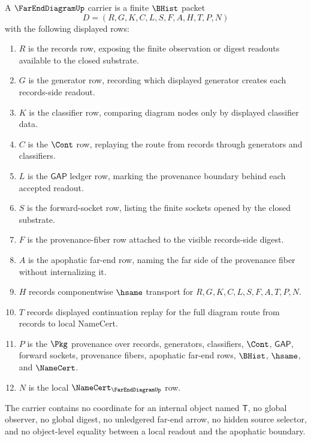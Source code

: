 \begin{definition}
\label{def:far-end-diagram-packet}
A $\FarEndDiagramUp$ carrier is a finite $\BHist$ packet
$$
D=(R,G,K,C,L,S,F,A,H,T,P,N)
$$
with the following displayed rows:
\begin{enumerate}
\item $R$ is the records row, exposing the finite observation or digest readouts available to the closed substrate.
\item $G$ is the generator row, recording which displayed generator creates each records-side readout.
\item $K$ is the classifier row, comparing diagram nodes only by displayed classifier data.
\item $C$ is the $\Cont$ row, replaying the route from records through generators and classifiers.
\item $L$ is the $\mathsf{GAP}$ ledger row, marking the provenance boundary behind each accepted readout.
\item $S$ is the forward-socket row, listing the finite sockets opened by the closed substrate.
\item $F$ is the provenance-fiber row attached to the visible records-side digest.
\item $A$ is the apophatic far-end row, naming the far side of the provenance fiber without internalizing it.
\item $H$ records componentwise $\hsame$ transport for $R,G,K,C,L,S,F,A,T,P,N$.
\item $T$ records displayed continuation replay for the full diagram route from records to local NameCert.
\item $P$ is the $\Pkg$ provenance over records, generators, classifiers, $\Cont$, $\mathsf{GAP}$, forward sockets, provenance fibers, apophatic far-end rows, $\BHist$, $\hsame$, and $\NameCert$.
\item $N$ is the local $\NameCert_{\FarEndDiagramUp}$ row.
\end{enumerate}
The carrier contains no coordinate for an internal object named $\mathsf{T}$, no global observer, no global digest, no unledgered far-end arrow, no hidden source selector, and no object-level equality between a local readout and the apophatic boundary.
\end{definition}

